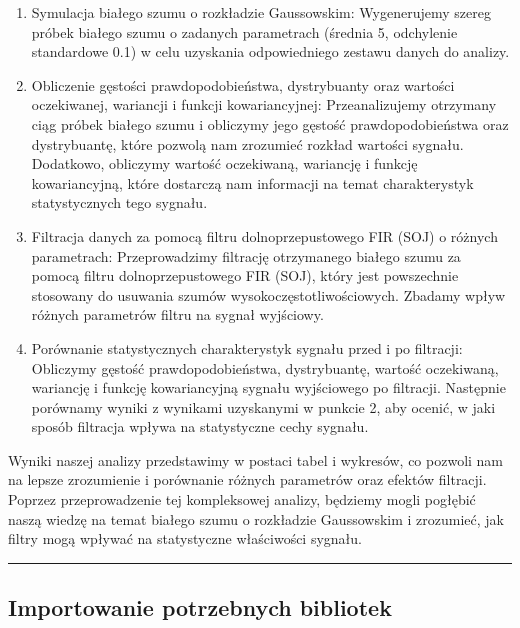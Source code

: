 \documentclass[11pt]{article}
\begin{document}
\begin{enumerate}
\def\labelenumi{\arabic{enumi}.}
\item
  Symulacja białego szumu o rozkładzie Gaussowskim: Wygenerujemy szereg
  próbek białego szumu o zadanych parametrach (średnia 5, odchylenie
  standardowe 0.1) w celu uzyskania odpowiedniego zestawu danych do
  analizy.
\item
  Obliczenie gęstości prawdopodobieństwa, dystrybuanty oraz wartości
  oczekiwanej, wariancji i funkcji kowariancyjnej: Przeanalizujemy
  otrzymany ciąg próbek białego szumu i obliczymy jego gęstość
  prawdopodobieństwa oraz dystrybuantę, które pozwolą nam zrozumieć
  rozkład wartości sygnału. Dodatkowo, obliczymy wartość oczekiwaną,
  wariancję i funkcję kowariancyjną, które dostarczą nam informacji na
  temat charakterystyk statystycznych tego sygnału.
\item
  Filtracja danych za pomocą filtru dolnoprzepustowego FIR (SOJ) o
  różnych parametrach: Przeprowadzimy filtrację otrzymanego białego
  szumu za pomocą filtru dolnoprzepustowego FIR (SOJ), który jest
  powszechnie stosowany do usuwania szumów wysokoczęstotliwościowych.
  Zbadamy wpływ różnych parametrów filtru na sygnał wyjściowy.
\item
  Porównanie statystycznych charakterystyk sygnału przed i po filtracji:
  Obliczymy gęstość prawdopodobieństwa, dystrybuantę, wartość
  oczekiwaną, wariancję i funkcję kowariancyjną sygnału wyjściowego po
  filtracji. Następnie porównamy wyniki z wynikami uzyskanymi w punkcie
  2, aby ocenić, w jaki sposób filtracja wpływa na statystyczne cechy
  sygnału.
\end{enumerate}

Wyniki naszej analizy przedstawimy w postaci tabel i wykresów, co
pozwoli nam na lepsze zrozumienie i porównanie różnych parametrów oraz
efektów filtracji. Poprzez przeprowadzenie tej kompleksowej analizy,
będziemy mogli pogłębić naszą wiedzę na temat białego szumu o rozkładzie
Gaussowskim i zrozumieć, jak filtry mogą wpływać na statystyczne
właściwości sygnału.

    \begin{center}\rule{0.5\linewidth}{0.5pt}\end{center}

    \hypertarget{importowanie-potrzebnych-bibliotek}{%
\subsection{Importowanie potrzebnych
bibliotek}\label{importowanie-potrzebnych-bibliotek}}
\end{document}
